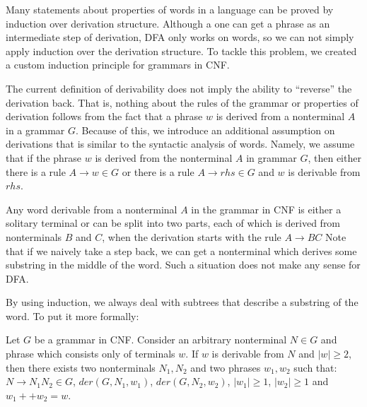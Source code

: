 Many statements about properties of words in a language can be proved by induction over derivation structure.
Although a one can get a phrase as an intermediate step of derivation, DFA only works on words, so we can not simply apply induction over the derivation structure. To tackle this problem, we created a custom induction principle for grammars in CNF.

The current definition of derivability does not imply the ability to ``reverse'' the derivation back. That is, nothing about the rules of the grammar or properties of derivation follows from the fact that a phrase $w$ is derived from a nonterminal $A$ in a grammar $G$. Because of this, we introduce an additional assumption on derivations that is similar to the syntactic analysis of words.
Namely, we assume that if the phrase $w$ is derived from the nonterminal $A$ in grammar $G$, then either there is a rule $A \to w \in G$ or there is a rule $A \to rhs \in G$ and $w$ is derivable from $rhs$.



Any word derivable from a nonterminal $A$ in the grammar in CNF is either a solitary terminal or can be split into two parts, each of which is derived from nonterminals $B$ and $C$, when the derivation starts with the rule $A \to B C$
Note that if we naively take a step back, we can get a nonterminal which derives some substring in the middle of the word.
Such a situation does not make any sense for DFA.

By using induction, we always deal with subtrees that describe a substring of the word.
%
To put it more formally:
\begin{lemma} \label{lemma:chomskyind1}
Let $G$ be a grammar in CNF. Consider an arbitrary nonterminal $N \in G$ and phrase which consists only of terminals $w$.
If $w$ is derivable from $N$ and $|w| \ge 2$, then there exists two nonterminals $N_1, N_2$ and two phrases $w_1, w_2$ such that: $N \to N_1 N_2 \in G$, $der(G, N_1, w_1)$, $der(G, N_2, w_2)$, $|w_1| \ge 1$, $|w_2| \ge 1$ and $w_1 ++ w_2 = w$.
\end{lemma}


